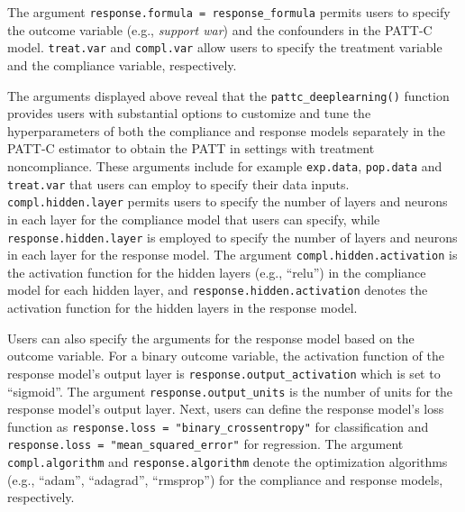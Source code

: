 The argument \texttt{response.formula\ =\ response\_formula} permits users to
specify the outcome variable (e.g., \emph{support war}) and the confounders
in the PATT-C model. \texttt{treat.var} and \texttt{compl.var} allow users to specify
the treatment variable and the compliance variable, respectively.

The arguments displayed above reveal that the \texttt{pattc\_deeplearning()}
function provides users with substantial options to customize and tune
the hyperparameters of both the compliance and response models
separately in the PATT-C estimator to obtain the PATT in settings with
treatment noncompliance. These arguments include for example \texttt{exp.data},
\texttt{pop.data} and \texttt{treat.var} that users can employ to specify their data
inputs. \texttt{compl.hidden.layer} permits users to specify the number of
layers and neurons in each layer for the compliance model that users can
specify, while \texttt{response.hidden.layer} is employed to specify the number
of layers and neurons in each layer for the response model. The argument
\texttt{compl.hidden.activation} is the activation function for the hidden
layers (e.g., ``relu'') in the compliance model for each hidden layer, and
\texttt{response.hidden.activation} denotes the activation function for the
hidden layers in the response model.

Users can also specify the arguments for the response model based on the
outcome variable. For a binary outcome variable, the activation function
of the response model's output layer is \texttt{response.output\_activation}
which is set to ``sigmoid''. The argument \texttt{response.output\_units} is the
number of units for the response model's output layer. Next, users can
define the response model's loss function as
\texttt{response.loss\ =\ "binary\_crossentropy"} for classification and
\texttt{response.loss\ =\ "mean\_squared\_error"} for regression. The argument
\texttt{compl.algorithm} and \texttt{response.algorithm} denote the optimization
algorithms (e.g., ``adam'', ``adagrad'', ``rmsprop'') for the compliance and
response models, respectively.

